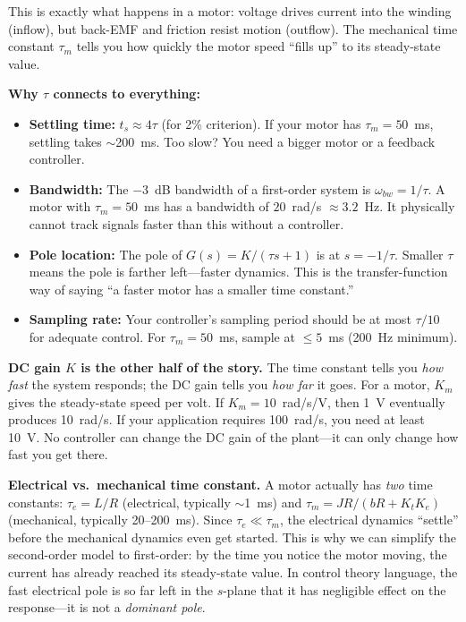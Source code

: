 \begin{mdframed}[linewidth=1pt, innertopmargin=10pt, innerbottommargin=10pt]
This is exactly what happens in a motor: voltage drives current into the winding (inflow), but back-EMF and friction resist motion (outflow). The mechanical time constant $\tau_m$ tells you how quickly the motor speed ``fills up'' to its steady-state value.

\textbf{Why $\tau$ connects to everything:}
\begin{itemize}[nosep]
    \item \textbf{Settling time:} $t_s \approx 4\tau$ (for 2\% criterion). If your motor has $\tau_m = 50$~ms, settling takes $\sim$200~ms. Too slow? You need a bigger motor or a feedback controller.
    \item \textbf{Bandwidth:} The $-3$~dB bandwidth of a first-order system is $\omega_{bw} = 1/\tau$. A motor with $\tau_m = 50$~ms has a bandwidth of $20$~rad/s $\approx 3.2$~Hz. It physically cannot track signals faster than this without a controller.
    \item \textbf{Pole location:} The pole of $G(s) = K/(\tau s + 1)$ is at $s = -1/\tau$. Smaller $\tau$ means the pole is farther left---faster dynamics. This is the transfer-function way of saying ``a faster motor has a smaller time constant.''
    \item \textbf{Sampling rate:} Your controller's sampling period should be at most $\tau/10$ for adequate control. For $\tau_m = 50$~ms, sample at $\leq 5$~ms (200~Hz minimum).
\end{itemize}

\textbf{DC gain $K$ is the other half of the story.} The time constant tells you \textit{how fast} the system responds; the DC gain tells you \textit{how far} it goes. For a motor, $K_m$ gives the steady-state speed per volt. If $K_m = 10$~rad/s/V, then 1~V eventually produces 10~rad/s. If your application requires 100~rad/s, you need at least 10~V. No controller can change the DC gain of the plant---it can only change how fast you get there.

\textbf{Electrical vs.\ mechanical time constant.} A motor actually has \textit{two} time constants: $\tau_e = L/R$ (electrical, typically $\sim$1~ms) and $\tau_m = JR/(bR + K_tK_e)$ (mechanical, typically 20--200~ms). Since $\tau_e \ll \tau_m$, the electrical dynamics ``settle'' before the mechanical dynamics even get started. This is why we can simplify the second-order model to first-order: by the time you notice the motor moving, the current has already reached its steady-state value. In control theory language, the fast electrical pole is so far left in the $s$-plane that it has negligible effect on the response---it is not a \textit{dominant pole}.


\end{mdframed}
